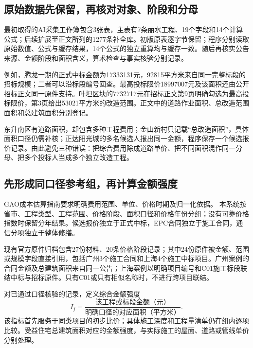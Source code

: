 \documentclass[UTF8,11pt,fontset=windows]{ctexart}
\begin{document}
\subsection{原始数据先保留，再核对对象、阶段和分母}

最初取得的AI采集工作簿包含3张表，主表有7条丽水工程、19个字段和14个计算公式；后续扩展至正文所列的1277条补全库。初版原表逐字节保留；程序分别读取原始数值、公式与缓存结果，14个公式的独立重算均与缓存一致。随后再核实公告来源、金额阶段和面积含义，算术检查与事实核验分别记录。

例如，腾龙一期的正式中标金额为17333131元，92815平方米来自同一完整标段的招标规模；二者可以沿标段编号回查。最高投标限价18997007元及该面积还由公开招标正文同一原件支持。叶坦区块的7732717元在招标正文第9页明确勾选为最高投标限价，第3页给出53021平方米的改造范围。正文中的道路作业面积、总改造范围面积和总建筑面积分别登记。

东升南区有道路面积，却包含多种工程费用；金山新村只记载“总改造面积”，具体面积口径仍需补核；正达阳光城的多名候选人报出同一金额，程序保存一个候选报价记录。由此避免三种错误：把综合费用除成道路单价、把不同面积混作同一分母、把多个投标人当成多个独立改造工程。

\subsection{先形成同口径参考组，再计算金额强度}

GAO成本估算指南要求明确费用范围、单位、价格时期及归一化依据。\cite{gao2020} 本系统按省市、工程类型、工程范围、价格阶段、面积口径和价格年份分组；没有可靠价格指数时保留分年结果。候选报价独立于正式中标，EPC合同独立于施工合同，通信分项独立于整体修缮。

现有官方原件归档包含27份材料、20条价格阶段记录；其中24份原件被金额、范围或规模字段直接引用，包括广州3个施工合同和上海4个施工中标项目。广州案例的合同金额及总建筑面积来自同一公告；上海案例以明确项目编号和C01施工标段联结中标与招标原件。只有C01或只有相似名称时，不进行跨项目联结。

对已通过口径核验的记录，定义综合金额强度
\begin{equation}
 I_j=\frac{\text{该工程或标段金额（元）}}{\text{明确口径的对应面积（平方米）}}.
\end{equation}
该指标首先服务于同类项目的初步比价；具体施工深度和工程量清单仍在组内逐项比较。受益住宅总建筑面积对应的金额强度，与实际施工的屋面、道路或管线单价分别处理。
\end{document}
